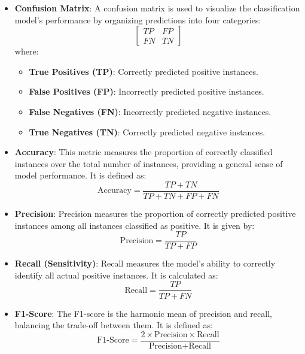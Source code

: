 \documentclass[12pt]{article}
\begin{document}
        \begin{itemize}
            \item \textbf{Confusion Matrix}: A confusion matrix is used to visualize the classification model's performance by organizing predictions into four categories:
            \[
            \begin{bmatrix}
            TP & FP \\
            FN & TN
            \end{bmatrix}
            \]
            where:
            \begin{itemize}
                \item \textbf{True Positives (TP)}: Correctly predicted positive instances.
                \item \textbf{False Positives (FP)}: Incorrectly predicted positive instances.
                \item \textbf{False Negatives (FN)}: Incorrectly predicted negative instances.
                \item \textbf{True Negatives (TN)}: Correctly predicted negative instances.
            \end{itemize}

            \item \textbf{Accuracy}: This metric measures the proportion of correctly classified instances over the total number of instances, providing a general sense of model performance. It is defined as:
            \begin{equation*}
                \text{Accuracy} = \frac{TP + TN}{TP + TN + FP + FN}
            \end{equation*}
    
            \item \textbf{Precision}: Precision measures the proportion of correctly predicted positive instances among all instances classified as positive. It is given by:
            \begin{equation*}
                \text{Precision} = \frac{TP}{TP + FP}
            \end{equation*}
        
            \item \textbf{Recall (Sensitivity)}: Recall measures the model's ability to correctly identify all actual positive instances. It is calculated as:
            \begin{equation*}
                \text{Recall} = \frac{TP}{TP + FN}
            \end{equation*}
            
            \item \textbf{F1-Score}: The F1-score is the harmonic mean of precision and recall, balancing the trade-off between them. It is defined as:
            \begin{equation*}
                \text{F1-Score} = \frac{2 \times \text{Precision} \times \text{Recall}}{\text{Precision} + \text{Recall}}
            \end{equation*}
        \end{itemize}
\end{document}
